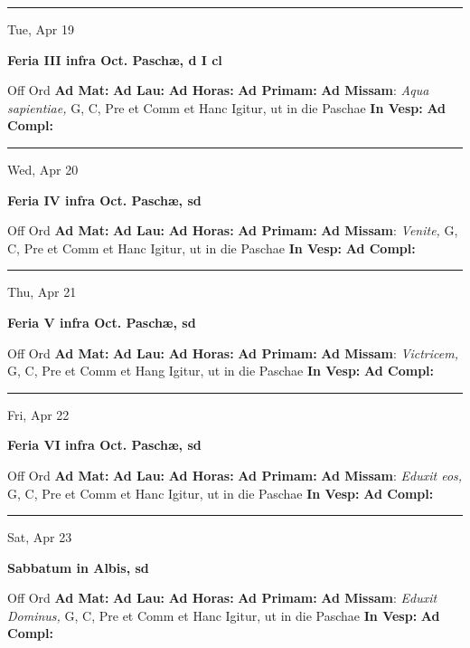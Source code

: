 \documentclass[letterpaper, 10pt]{article}
\begin{document}
\hrule
\begin{center}
Tue, Apr 19
\end{center}\textbf{ \large Feria III infra Oct. Paschæ, \textnormal{\normalsize d I cl}}
\begin{justify}
Off Ord
\textbf{Ad Mat: }
\textbf{Ad Lau: }
\textbf{Ad Horas: }
\textbf{Ad Primam: }
\textbf{Ad Missam}: \textit{Aqua sapientiae,} G, C, Pre et Comm et Hanc Igitur, ut in die Paschae
\textbf{In Vesp: }
\textbf{Ad Compl: }\end{justify}



\hrule
\begin{center}
Wed, Apr 20
\end{center}\textbf{ \large Feria IV infra Oct. Paschæ, \textnormal{\normalsize sd}}
\begin{justify}
Off Ord
\textbf{Ad Mat: }
\textbf{Ad Lau: }
\textbf{Ad Horas: }
\textbf{Ad Primam: }
\textbf{Ad Missam}: \textit{Venite,} G, C, Pre et Comm et Hanc Igitur, ut in die Paschae
\textbf{In Vesp: }
\textbf{Ad Compl: }\end{justify}



\hrule
\begin{center}
Thu, Apr 21
\end{center}\textbf{ \large Feria V infra Oct. Paschæ, \textnormal{\normalsize sd}}
\begin{justify}
Off Ord
\textbf{Ad Mat: }
\textbf{Ad Lau: }
\textbf{Ad Horas: }
\textbf{Ad Primam: }
\textbf{Ad Missam}: \textit{Victricem,} G, C, Pre et Comm et Hang Igitur, ut in die Paschae
\textbf{In Vesp: }
\textbf{Ad Compl: }\end{justify}



\hrule
\begin{center}
Fri, Apr 22
\end{center}\textbf{ \large Feria VI infra Oct. Paschæ, \textnormal{\normalsize sd}}
\begin{justify}
Off Ord
\textbf{Ad Mat: }
\textbf{Ad Lau: }
\textbf{Ad Horas: }
\textbf{Ad Primam: }
\textbf{Ad Missam}: \textit{Eduxit eos,} G, C, Pre et Comm et Hanc Igitur, ut in die Paschae
\textbf{In Vesp: }
\textbf{Ad Compl: }\end{justify}



\hrule
\begin{center}
Sat, Apr 23
\end{center}\textbf{ \large Sabbatum in Albis, \textnormal{\normalsize sd}}
\begin{justify}
Off Ord
\textbf{Ad Mat: }
\textbf{Ad Lau: }
\textbf{Ad Horas: }
\textbf{Ad Primam: }
\textbf{Ad Missam}: \textit{Eduxit Dominus,} G, C, Pre et Comm et Hanc Igitur, ut in die Paschae
\textbf{In Vesp: }
\textbf{Ad Compl: }\end{justify}
\end{document}
